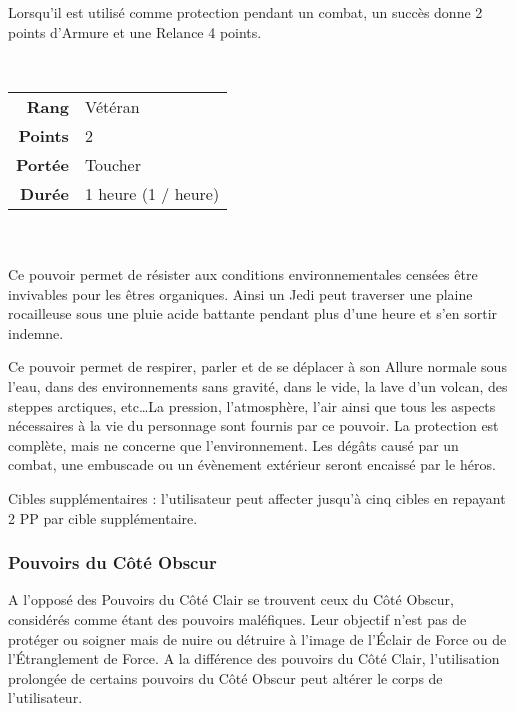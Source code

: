 \begin{description}[align=left]
        Lorsqu’il est utilisé comme protection pendant un combat, un succès donne 2 points d’Armure et une Relance 4 points.
        \\

    \item [Adaptation de Force] ~ \\

        \begin{tabular}{ r l }
            \textbf{Rang}    & Vétéran \\
            \textbf{Points}  & 2 \\
            \textbf{Portée}  & Toucher \\
            \textbf{Durée}   & 1 heure (1 / heure) \\
        \end{tabular}
        \\ \\
        Ce pouvoir permet de résister aux conditions environnementales censées être invivables pour les êtres organiques. Ainsi un Jedi peut traverser une plaine rocailleuse sous une pluie acide battante pendant plus d’une heure et s’en sortir indemne.

        Ce pouvoir permet de respirer, parler et de se déplacer à son Allure normale sous l’eau, dans des environnements sans gravité, dans le vide, la lave d’un volcan, des steppes arctiques, etc\ldots La pression, l’atmosphère, l’air ainsi que tous les aspects nécessaires à la vie du personnage sont fournis par ce pouvoir. La protection est complète, mais ne concerne que l’environnement. Les dégâts causé par un combat, une embuscade ou un évènement extérieur seront encaissé par le héros.

        Cibles supplémentaires : l’utilisateur peut affecter jusqu’à cinq cibles en repayant 2 PP par cible supplémentaire.
        \\

\end{description}

\subsubsection{Pouvoirs du Côté Obscur}

A l’opposé des Pouvoirs du Côté Clair se trouvent ceux du Côté Obscur, considérés comme étant des pouvoirs maléfiques. Leur objectif n’est pas de protéger ou soigner mais de nuire ou détruire à l’image de l’\'Eclair de Force ou de l’\'Etranglement de Force. A la différence des pouvoirs du Côté Clair, l’utilisation prolongée de certains pouvoirs du Côté Obscur peut altérer le corps de l’utilisateur.


